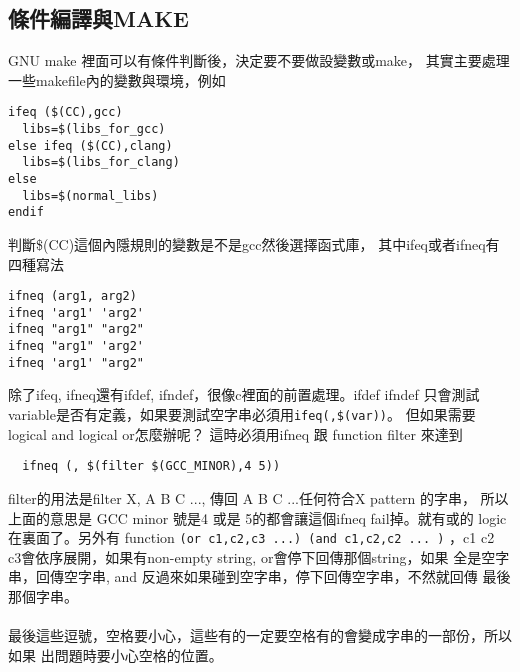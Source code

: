   \subsection{條件編譯與MAKE}
  GNU make 裡面可以有條件判斷後，決定要不要做設變數或make，
  其實主要處理一些makefile內的變數與環境，例如
  \begin{verbatim}
ifeq ($(CC),gcc)
  libs=$(libs_for_gcc)
else ifeq ($(CC),clang)
  libs=$(libs_for_clang)
else
  libs=$(normal_libs)
endif
  \end{verbatim}
  判斷\$(CC)這個內隱規則的變數是不是gcc然後選擇函式庫，
  其中ifeq或者ifneq有四種寫法
  \begin{verbatim}
ifneq (arg1, arg2) 
ifneq 'arg1' 'arg2' 
ifneq "arg1" "arg2" 
ifneq "arg1" 'arg2' 
ifneq 'arg1' "arg2" 
  \end{verbatim}
  除了ifeq, ifneq還有ifdef, ifndef，很像c裡面的前置處理。ifdef ifndef 只會測試
  variable是否有定義，如果要測試空字串必須用\verb=ifeq(,$(var))=。
  但如果需要logical and logical or怎麼辦呢？ 這時必須用ifneq 跟 function filter
  來達到
  \begin{verbatim}
  ifneq (, $(filter $(GCC_MINOR),4 5))
  \end{verbatim}
  filter的用法是filter X, A B C ..., 傳回 A B C ...任何符合X pattern 的字串，
  所以上面的意思是 GCC minor 號是4 或是 5的都會讓這個ifneq fail掉。就有或的
  logic在裏面了。另外有 function \verb=(or c1,c2,c3 ...) (and c1,c2,c2 ... )=
  ，c1 c2 c3會依序展開，如果有non-empty string, or會停下回傳那個string，如果
  全是空字串，回傳空字串, and 反過來如果碰到空字串，停下回傳空字串，不然就回傳
  最後那個字串。
  \\\\
  最後這些逗號，空格要小心，這些有的一定要空格有的會變成字串的一部份，所以如果
  出問題時要小心空格的位置。

